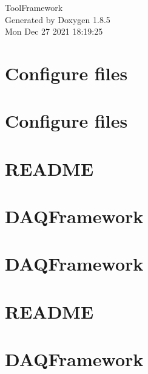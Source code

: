 \documentclass[twoside]{book}
\newcommand{\clearemptydoublepage}{%
  \newpage{\pagestyle{empty}\cleardoublepage}%
}
\begin{document}
\hypersetup{pageanchor=false}
\begin{titlepage}
\vspace*{7cm}
\begin{center}%
{\Large Tool\-Framework }\\
\vspace*{1cm}
{\large Generated by Doxygen 1.8.5}\\
\vspace*{0.5cm}
{\small Mon Dec 27 2021 18:19:25}\\
\end{center}
\end{titlepage}
\clearemptydoublepage
\tableofcontents
\clearemptydoublepage
{}
\hypersetup{pageanchor=true}

\chapter{Configure files}
\label{md_configfiles_README}
\hypertarget{md_configfiles_README}{}

\chapter{Configure files}
\label{md_configfiles_template_README}
\hypertarget{md_configfiles_template_README}{}

\chapter{R\-E\-A\-D\-M\-E}
\label{md_DataModel_README}
\hypertarget{md_DataModel_README}{}

\chapter{D\-A\-Q\-Framework}
\label{md_include_README}
\hypertarget{md_include_README}{}

\chapter{D\-A\-Q\-Framework}
\label{md_lib_README}
\hypertarget{md_lib_README}{}

\chapter{R\-E\-A\-D\-M\-E}
\label{md_README}
\hypertarget{md_README}{}

\chapter{D\-A\-Q\-Framework}
\label{md_src_Store_README}
\hypertarget{md_src_Store_README}{}

\end{document}
